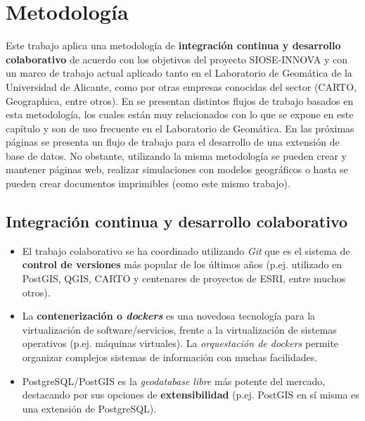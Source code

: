 
\chapter{Metodología}\label{chap:metod}

Este trabajo aplica una metodología de \textbf{integración continua y desarrollo colaborativo} de acuerdo con los objetivos del proyecto SIOSE-INNOVA y con un marco de trabajo actual aplicado tanto en el Laboratorio de Geomática de la Universidad de Alicante, como por otras empresas conocidas del sector (CARTO, Geographica, entre otros). En \citet{Zaragozi2017} se presentan distintos flujos de trabajo basados en esta metodología, los cuales están muy relacionados con lo que se expone en este capítulo y son de uso frecuente en el Laboratorio de Geomática. En las próximas páginas se presenta un flujo de trabajo para el desarrollo de una extensión de base de datos. No obstante, utilizando la misma metodología se pueden crear y mantener páginas web, realizar simulaciones con modelos geográficos o hasta se pueden crear documentos imprimibles (como este mismo trabajo).


\section{Integración continua y desarrollo colaborativo}

\begin{graybox}
\begin{itemize}
\item El trabajo colaborativo se ha coordinado utilizando \textit{Git} que es el sistema de \textbf{control de versiones} más popular de los últimos años (p.ej. utilizado en PostGIS, QGIS, CARTO y centenares de proyectos de ESRI, entre muchos otros).
\item La \textbf{contenerización o \textit{dockers}} es una novedosa tecnología para la virtualización de software/servicios, frente a la virtualización de sistemas operativos (p.ej. máquinas virtuales). La \textit{orquestación de dockers} permite organizar complejos sistemas de información con muchas facilidades.
\item PostgreSQL/PostGIS es la \textit{geodatabase libre} más potente del mercado, destacando por sus opciones de \textbf{extensibilidad} (p.ej. PostGIS en sí misma es una extensión de PostgreSQL).
\end{itemize}
\end{graybox}

